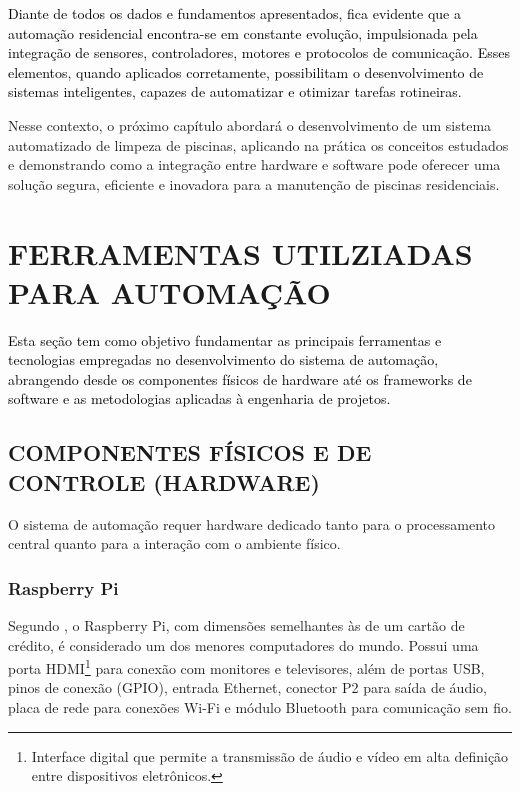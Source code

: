     \textcolor{black}{Diante de todos os dados e fundamentos apresentados, fica evidente que a automação residencial encontra-se em constante evolução, impulsionada pela integração de sensores, controladores, motores e protocolos de comunicação. Esses elementos, quando aplicados corretamente, possibilitam o desenvolvimento de sistemas inteligentes, capazes de automatizar e otimizar tarefas rotineiras.}

    Nesse contexto, o próximo capítulo abordará o desenvolvimento de um sistema automatizado de limpeza de piscinas, aplicando na prática os conceitos estudados e demonstrando como a integração entre hardware e software pode oferecer uma solução segura, eficiente e inovadora para a manutenção de piscinas residenciais.

\section{FERRAMENTAS UTILZIADAS PARA AUTOMAÇÃO}

    \textcolor{black}{Esta seção tem como objetivo fundamentar as principais ferramentas e tecnologias empregadas no desenvolvimento do sistema de automação, abrangendo desde os componentes físicos de hardware até os frameworks de software e as metodologias aplicadas à engenharia de projetos.}

    \subsection{COMPONENTES FÍSICOS E DE CONTROLE (HARDWARE)}

        O sistema de automação requer hardware dedicado tanto para o processamento central quanto para a interação com o ambiente físico.

        \subsubsection*{Raspberry Pi}

            Segundo \cite{juca2018aplicaccoes}, o Raspberry Pi, com dimensões semelhantes às de um cartão de crédito, é considerado um dos menores computadores do mundo. Possui uma porta HDMI\footnote{Interface digital que permite a transmissão de áudio e vídeo em alta definição entre dispositivos eletrônicos.} para conexão com monitores e televisores, além de portas USB, pinos de conexão (GPIO), entrada Ethernet, conector P2 para saída de áudio, placa de rede para conexões Wi-Fi e módulo Bluetooth para comunicação sem fio.

